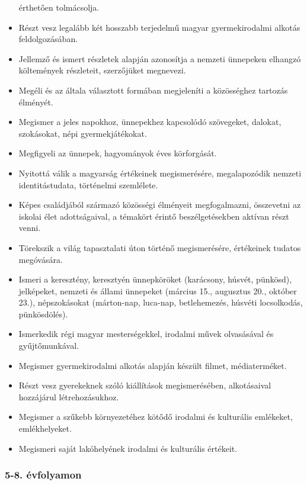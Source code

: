 \begin{itemize}
  érthetően tolmácsolja.
\item
  Részt vesz legalább két hosszabb terjedelmű magyar gyermekirodalmi
  alkotás feldolgozásában.
\item
  Jellemző és ismert részletek alapján azonosítja a nemzeti ünnepeken
  elhangzó költemények részleteit, szerzőjüket megnevezi.
\item
  Megéli és az általa választott formában megjeleníti a közösséghez
  tartozás élményét.
\item
  Megismer a jeles napokhoz, ünnepekhez kapcsolódó szövegeket, dalokat,
  szokásokat, népi gyermekjátékokat.
\item
  Megfigyeli az ünnepek, hagyományok éves körforgását.
\item
  Nyitottá válik a magyarság értékeinek megismerésére, megalapozódik
  nemzeti identitástudata, történelmi szemlélete.
\item
  Képes családjából származó közösségi élményeit megfogalmazni,
  összevetni az iskolai élet adottságaival, a témakört érintő
  beszélgetésekben aktívan részt venni.
\item
  Törekszik a világ tapasztalati úton történő megismerésére, értékeinek
  tudatos megóvására.
\item
  Ismeri a keresztény, keresztyén ünnepköröket (karácsony, húsvét,
  pünkösd), jelképeket, nemzeti és állami ünnepeket (március 15.,
  augusztus 20., október 23.), népszokásokat (márton-nap, luca-nap,
  betlehemezés, húsvéti locsolkodás, pünkösdölés).
\item
  Ismerkedik régi magyar mesterségekkel, irodalmi művek olvasásával és
  gyűjtőmunkával.
\item
  Megismer gyermekirodalmi alkotás alapján készült filmet,
  médiaterméket.
\item
  Részt vesz gyerekeknek szóló kiállítások megismerésében, alkotásaival
  hozzájárul létrehozásukhoz.
\item
  Megismer a szűkebb környezetéhez kötődő irodalmi és kulturális
  emlékeket, emlékhelyeket.
\item
  Megismeri saját lakóhelyének irodalmi és kulturális értékeit.
\end{itemize}

\hypertarget{evfolyamon-22}{%
\subsubsection{5-8. évfolyamon}\label{evfolyamon-22}}


